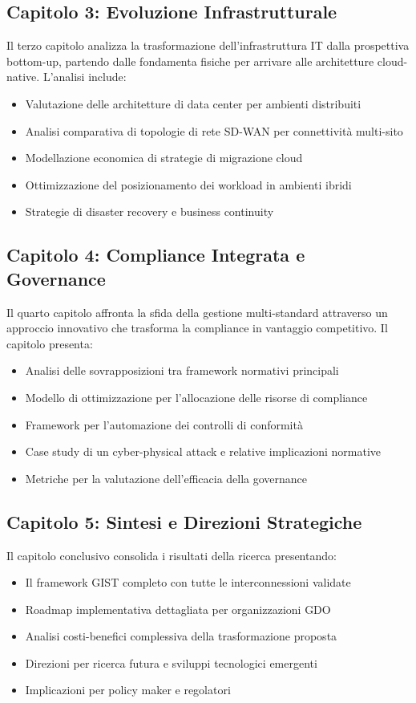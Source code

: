 \subsection{Capitolo 3: Evoluzione Infrastrutturale}

Il terzo capitolo analizza la trasformazione dell'infrastruttura IT dalla prospettiva bottom-up, partendo dalle fondamenta fisiche per arrivare alle architetture cloud-native. L'analisi include:
\begin{itemize}
\item Valutazione delle architetture di data center per ambienti distribuiti
\item Analisi comparativa di topologie di rete SD-WAN per connettività multi-sito
\item Modellazione economica di strategie di migrazione cloud
\item Ottimizzazione del posizionamento dei workload in ambienti ibridi
\item Strategie di disaster recovery e business continuity
\end{itemize}

\subsection{Capitolo 4: Compliance Integrata e Governance}

Il quarto capitolo affronta la sfida della gestione multi-standard attraverso un approccio innovativo che trasforma la compliance in vantaggio competitivo. Il capitolo presenta:
\begin{itemize}
\item Analisi delle sovrapposizioni tra framework normativi principali
\item Modello di ottimizzazione per l'allocazione delle risorse di compliance
\item Framework per l'automazione dei controlli di conformità
\item Case study di un cyber-physical attack e relative implicazioni normative
\item Metriche per la valutazione dell'efficacia della governance
\end{itemize}

\subsection{Capitolo 5: Sintesi e Direzioni Strategiche}

Il capitolo conclusivo consolida i risultati della ricerca presentando:
\begin{itemize}
\item Il framework GIST completo con tutte le interconnessioni validate
\item Roadmap implementativa dettagliata per organizzazioni GDO
\item Analisi costi-benefici complessiva della trasformazione proposta
\item Direzioni per ricerca futura e sviluppi tecnologici emergenti
\item Implicazioni per policy maker e regolatori
\end{itemize}

